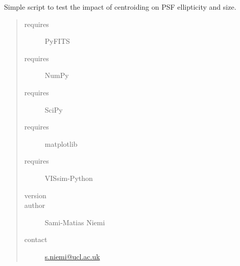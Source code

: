 \documentclass[a4paper,11pt,english]{sphinxmanual}
\begin{document}
\label{analysis:module-analysis.PSFcentroidingEffects}
Simple script to test the impact of centroiding on PSF ellipticity and size.
\begin{quote}\begin{description}
\item[{requires}] \leavevmode
PyFITS

\item[{requires}] \leavevmode
NumPy

\item[{requires}] \leavevmode
SciPy

\item[{requires}] \leavevmode
matplotlib

\item[{requires}] \leavevmode
VISsim-Python

\item[{version}] 

\item[{author}] \leavevmode
Sami-Matias Niemi

\item[{contact}] \leavevmode
\href{mailto:s.niemi@ucl.ac.uk}{s.niemi@ucl.ac.uk}

\end{description}\end{quote}
\end{document}
